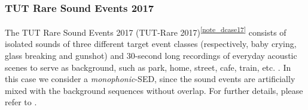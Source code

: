 \subsubsection{TUT Rare Sound Events 2017} 
The TUT Rare Sound Events 2017 (TUT-Rare 2017)\textsuperscript{\ref{note_dcase17}} \cite{DCASE2017challenge} consists of isolated sounds of three different target event classes (respectively, baby crying, glass breaking and gunshot) and 30-second long recordings of everyday acoustic scenes to serve as background, such as park, home, street, cafe, train, etc. \cite{mesaros2016tut}. In this case we consider a \textit{monophonic}-SED, since the sound events are artificially mixed with the background sequences without overlap. For further details, please refer to .



